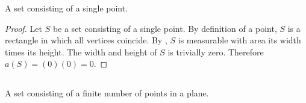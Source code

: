 \documentclass{report}
\begin{document}
A set consisting of a single point.

\begin{proof}

  Let $S$ be a set consisting of a single point.
  By definition of a point, $S$ is a rectangle in which all vertices coincide.
  By , $S$ is measurable with area its width
    times its height.
  The width and height of $S$ is trivially zero.
  Therefore $a(S) = (0)(0) = 0$.

\end{proof}

\subsection{}%
\label{sub:exercise-1.7.1b}

A set consisting of a finite number of points in a plane.
\end{document}
